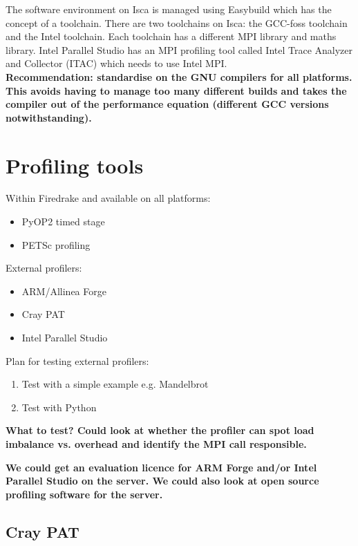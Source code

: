 \documentclass[a4paper,titlepage]{article}
\begin{document}
The software environment on Isca is managed using Easybuild which has the concept of a toolchain. There are two toolchains on Isca: the GCC-foss toolchain and the Intel toolchain. Each toolchain has a different MPI library and maths library. Intel Parallel Studio has an MPI profiling tool called Intel Trace Analyzer and Collector (ITAC) which needs to use Intel MPI. \\

\noindent
\textbf{Recommendation: standardise on the GNU compilers for all platforms. This avoids having to manage too many different builds and takes the compiler out of the performance equation (different GCC versions notwithstanding).}


\section{Profiling tools}

Within Firedrake and available on all platforms:
\begin{itemize}
\item PyOP2 timed stage
\item PETSc profiling
\end{itemize}
External profilers:
\begin{itemize}
\item ARM/Allinea Forge
\item Cray PAT
\item Intel Parallel Studio
\end{itemize}
%
Plan for testing external profilers:
\begin{enumerate}
\item Test with a simple example e.g. Mandelbrot
\item Test with Python
\end{enumerate}

\textbf{What to test? Could look at whether the profiler can spot load imbalance vs. overhead and identify the MPI call responsible.}

\textbf{We could get an evaluation licence for ARM Forge and/or Intel Parallel Studio on the server. We could also look at open source profiling software for the server.} \\

\subsection{Cray PAT}
\end{document}
